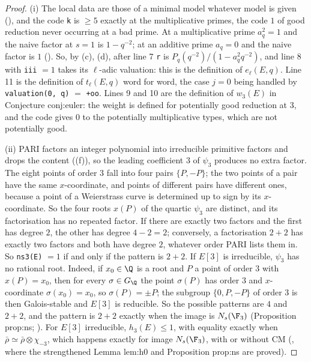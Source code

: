 \begin{sloppypar}
\begin{proof}
(i) The local data are those of a minimal model whatever model is given (), and the code \texttt{k} is $\ge5$
exactly at the multiplicative primes, the code $1$ of good reduction never occurring at a bad prime. At a multiplicative prime $a_q^2=1$ and the
naive factor at $s=1$ is $1-q^{-2}$; at an additive prime $a_q=0$ and the naive factor is $1$ (). So, by
(c), (d), after line 7 \texttt{r} is $P_q(q^{-2})/(1-a_q^2q^{-2})$, and line 8 with \texttt{iii} $=1$ takes its
$\ell$-adic valuation: this is the definition of $e_\ell(E,q)$. Line 11 is the definition of $t_\ell(E,q)$ word for word, the case $j=0$ being
handled by \texttt{valuation(0, q)} $=$ \texttt{+oo}. Lines 9 and 10 are the definition of $w_3(E)$ in Conjecture conj:euler: the weight is defined
for potentially good reduction at $3$, and the code gives $0$ to the potentially multiplicative types, which are not potentially good.

(ii) PARI factors an integer polynomial into irreducible primitive factors and drops the content ((f)), so the
leading coefficient $3$ of $\psi_3$ produces no extra factor. The eight points of order $3$ fall into four pairs $\{P,-P\}$; the two points of a pair
have the same $x$-coordinate, and points of different pairs have different ones, because a point of a Weierstrass curve is determined up to sign
by its $x$-coordinate. So the four roots $x(P)$ of the quartic $\psi_3$ are distinct, and its factorisation has no repeated factor. If
there are exactly two factors and the first has degree $2$, the other has degree $4-2=2$; conversely, a factorisation $2+2$ has exactly two
factors and both have degree $2$, whatever order PARI lists them in. So \texttt{ns3(E)} $=1$ if and only if the pattern is $2+2$. If $E[3]$ is
irreducible, $\psi_3$ has no rational root. Indeed, if $x_0\in\Q$ is a root and $P$ a point of order $3$ with $x(P)=x_0$, then for every
$\sigma\in G_\Q$ the point $\sigma(P)$ has order $3$ and $x$-coordinate $\sigma(x_0)=x_0$, so $\sigma(P)=\pm P$; the subgroup $\{0,P,-P\}$ of order $3$ is
then Galois-stable and $E[3]$ is reducible. So the possible patterns are $4$ and $2+2$, and the pattern is $2+2$ exactly when the image is $N_s(\F_3)$ (Proposition prop:ns;
). For $E[3]$ irreducible, $h_3(E)\le1$, with equality exactly when $\bar\rho\simeq\bar\rho\otimes\chi_{-3}$, which happens exactly for image
$N_s(\F_3)$, with or without CM (, where the strengthened Lemma lem:h0 and Proposition prop:ns are proved).


\end{proof}
\end{sloppypar}
